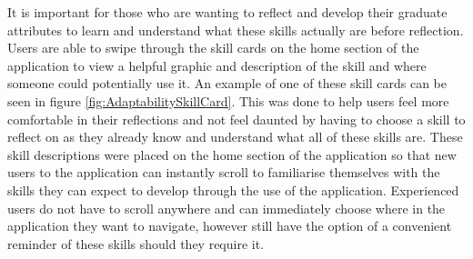 \documentclass{l4proj}
\begin{document}
It is important for those who are wanting to reflect and develop their graduate attributes to learn and understand what these skills actually are before reflection. Users are able to swipe through the skill cards on the home section of the application to view a helpful graphic and description of the skill and where someone could potentially use it. An example of one of these skill cards can be seen in figure \ref{fig:AdaptabilitySkillCard}. This was done to help users feel more comfortable in their reflections and not feel daunted by having to choose a skill to reflect on as they already know and understand what all of these skills are. These skill descriptions were placed on the home section of the application so that new users to the application can instantly scroll to familiarise themselves with the skills they can expect to develop through the use of the application. Experienced users do not have to scroll anywhere and can immediately choose where in the application they want to navigate, however still have the option of a convenient reminder of these skills should they require it. 
\end{document}

